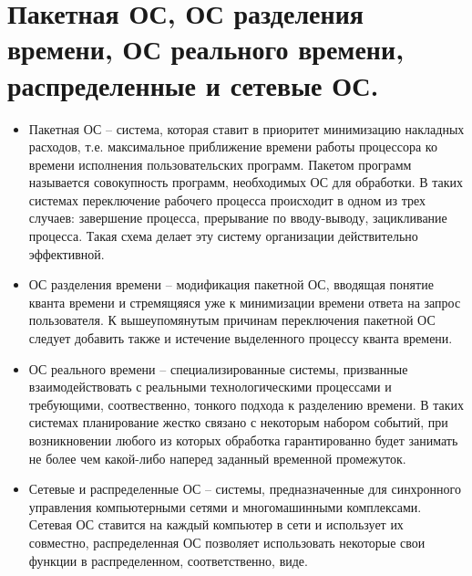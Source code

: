 \documentclass[a4paper,12pt,titlepage,finall]{article}
\begin{document}
\section{Пакетная ОС, ОС разделения времени, ОС реального времени,
распределенные и сетевые ОС.}
\begin{itemize}
    \item Пакетная ОС -- система, которая ставит в приоритет минимизацию накладных расходов, т.е. максимальное приближение времени работы процессора ко времени исполнения пользовательских программ. Пакетом программ называется совокупность программ, необходимых ОС для обработки. В таких системах переключение рабочего процесса происходит в одном из трех случаев: завершение процесса, прерывание по вводу-выводу, зацикливание процесса. Такая схема делает эту систему организации действительно эффективной.
    \item ОС разделения времени -- модификация пакетной ОС, вводящая понятие кванта времени и стремящяяся уже к минимизации времени ответа на запрос пользователя. К вышеупомянутым причинам переключения пакетной ОС следует добавить также и истечение выделенного процессу кванта времени.
    \item ОС реального времени -- специализированные системы, призванные взаимодействовать с реальными технологическими процессами и требующими, соотвественно, тонкого подхода к разделению времени. В таких системах планирование жестко связано с некоторым набором событий, при возникновении любого из которых обработка гарантированно будет занимать не более чем какой-либо наперед заданный временной промежуток.
    \item Сетевые и распределенные ОС -- системы, предназначенные для синхронного управления компьютерными сетями и многомашинными комплексами. Сетевая ОС ставится на каждый компьютер в сети и использует их совместно, распределенная ОС позволяет использовать некоторые свои функции в распределенном, соответственно, виде.
\end{itemize}
\end{document}

